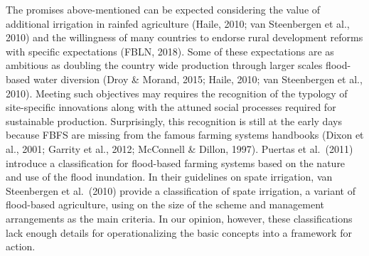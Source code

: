 \documentclass[]{elsarticle} %
\begin{document}
The promises above-mentioned can be expected considering the value of additional irrigation in rainfed agriculture (Haile, 2010; van Steenbergen et al., 2010) and the willingness of many countries to endorse rural development reforms with specific expectations (FBLN, 2018). Some of these expectations are as ambitious as doubling the country wide production through larger scales flood-based water diversion (Droy \& Morand, 2015; Haile, 2010; van Steenbergen et al., 2010). Meeting such objectives may requires the recognition of the typology of site-specific innovations along with the attuned social processes required for sustainable production. Surprisingly, this recognition is still at the early days because FBFS are missing from the famous farming systems handbooks (Dixon et al., 2001; Garrity et al., 2012; McConnell \& Dillon, 1997). Puertas et al.~(2011) introduce a classification for flood-based farming systems based on the nature and use of the flood inundation. In their guidelines on spate irrigation, van Steenbergen et al.~(2010) provide a classification of spate irrigation, a variant of flood-based agriculture, using on the size of the scheme and management arrangements as the main criteria. In our opinion, however, these classifications lack enough details for operationalizing the basic concepts into a framework for action.
\end{document}
